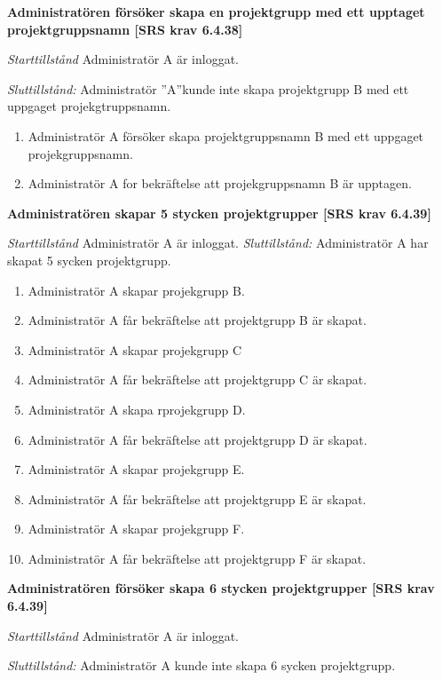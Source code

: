 \documentclass[a4paper]{article}
\begin{document}
\begin{FT}
\item %
\textbf{Administratören försöker skapa en projektgrupp med ett upptaget projektgruppsnamn [SRS krav 6.4.38]}

\emph{Starttillstånd} Administratör A är inloggat.

\emph{Sluttillstånd:} Administratör ”A”kunde inte skapa  projektgrupp B med ett uppgaget projekgtruppsnamn.

\begin{enumerate}
\item Administratör A försöker skapa  projektgruppsnamn B med ett uppgaget projekgruppsnamn.
\item Administratör A for bekräftelse att projekgruppsnamn B är upptagen.
\end{enumerate}

\item %
\textbf{Administratören skapar 5 stycken projektgrupper [SRS krav 6.4.39]}

\emph{Starttillstånd} Administratör A är inloggat. 
\emph{Sluttillstånd:} Administratör A har skapat 5 sycken projektgrupp.

\begin{enumerate}
\item Administratör A skapar projekgrupp B.
\item Administratör A får bekräftelse att projektgrupp B är skapat.
\item Administratör A skapar projekgrupp C
\item Administratör A får bekräftelse att projektgrupp C är skapat.
\item Administratör A skapa rprojekgrupp D.
\item Administratör A får bekräftelse att projektgrupp D är skapat.
\item Administratör A skapar projekgrupp E.
\item Administratör A får bekräftelse att projektgrupp E är skapat.
\item Administratör A skapar projekgrupp F.
\item Administratör A får bekräftelse att projektgrupp F är skapat.
\end{enumerate}

\item %
\textbf{Administratören försöker skapa 6 stycken projektgrupper [SRS krav 6.4.39]}

\emph{Starttillstånd} Administratör A är inloggat.

\emph{Sluttillstånd:} Administratör A kunde inte skapa 6 sycken  projektgrupp.


\end{FT}
\end{document}
